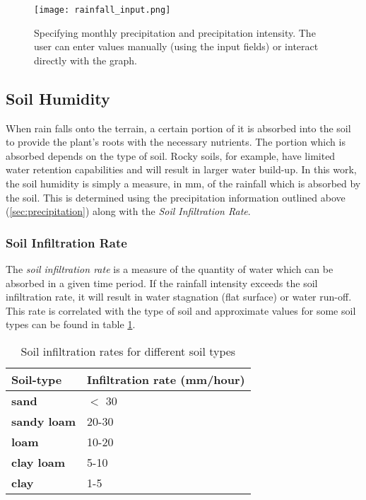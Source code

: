 \begin{figure}
\center
	\texttt{[image: rainfall\_input.png]}
	\caption{ Specifying monthly precipitation and precipitation intensity. The user can enter values manually (using the input fields) or interact directly with the graph.}
	\label{fig:rainfall_input}
\end{figure}

\subsection{Soil Humidity}

When rain falls onto the terrain, a certain portion of it is absorbed into the soil to provide the plant's roots with the necessary nutrients. The portion which is absorbed depends on the type of soil. Rocky soils, for example, have limited water retention capabilities and will result in larger water build-up. In this work, the soil humidity is simply a measure, in mm, of the rainfall which is absorbed by the soil. This is determined using the precipitation information outlined above (\ref{sec:precipitation}) along with the \textit{Soil Infiltration Rate}.

\subsubsection{Soil Infiltration Rate}

The \textit{soil infiltration rate} is a measure of the quantity of water which can be absorbed in a given time period. If the rainfall intensity exceeds the soil infiltration rate, it will result in water stagnation (flat surface) or water run-off. This rate is correlated with the type of soil and approximate values for some soil types can be found in table \ref{tab:control_types}.

\begin{table}[h]
  \centering
	    \begin{tabular}{|p{5cm}|p{8cm}|}
  	    \hline	
  	    \textbf{Soil-type} & \textbf{Infiltration rate (mm/hour)} \\
		\hline
		\textbf{sand} & $<$ 30 \\
		\hline
		\textbf{sandy loam} & 20-30 \\
		\hline
		\textbf{loam} & 10-20 \\
		\hline
		\textbf{clay loam} & 5-10 \\
		\hline
		\textbf{clay} & 1-5 \\
		\hline
		\end{tabular}
		\caption{Soil infiltration rates for different soil types \protect\footnotemark}
	  \label{tab:control_types}
\end{table}


